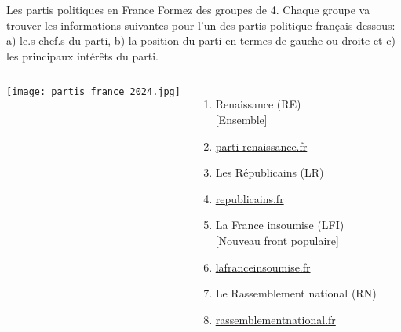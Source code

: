 \begin{frame}{Les partis politiques en France}
  \footnotesize
  Formez des groupes de 4.
  Chaque groupe va trouver les informations suivantes pour l'un des partis politique français dessous: a) le.s chef.s du parti, b) la position du parti en termes de gauche ou droite et c) les principaux intérêts du parti.
  \begin{columns}
      \begin{center}
        \texttt{[image: partis\_france\_2024.jpg]}
      \end{center}
      \begin{enumerate}
        \item Renaissance (RE) \\ {[Ensemble]}
        \item[] \href{https://parti-renaissance.fr/}{parti-renaissance.fr}
        \item Les Républicains (LR)
        \item[] \href{https://republicains.fr/}{republicains.fr}
        \item La France insoumise (LFI) \\ {[Nouveau front populaire]}
        \item[] \href{https://lafranceinsoumise.fr/}{lafranceinsoumise.fr}
        \item Le Rassemblement national (RN)
        \item[] \href{https://rassemblementnational.fr/}{rassemblementnational.fr}
      \end{enumerate}
  \end{columns}
\end{frame}
